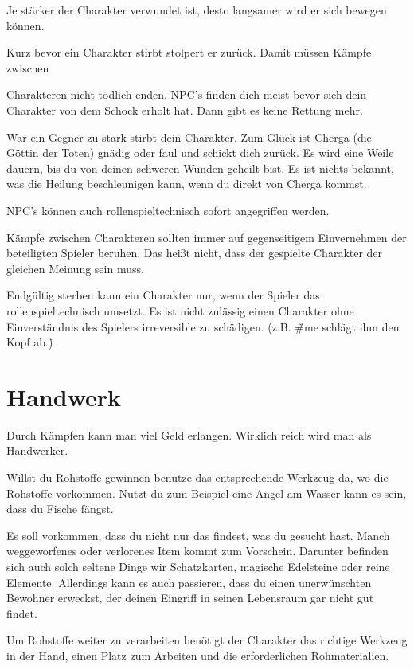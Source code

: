 \documentclass[a4paper,11pt]{book}
\begin{document}
Je stärker der Charakter verwundet ist, desto langsamer wird er sich bewegen können.

Kurz bevor ein Charakter stirbt stolpert er zurück. Damit müssen Kämpfe zwischen

Charakteren nicht tödlich enden. NPC’s finden dich meist bevor sich dein Charakter von dem Schock erholt hat. Dann gibt es keine Rettung mehr.

War ein Gegner zu stark stirbt dein Charakter. Zum Glück ist Cherga (die Göttin der Toten) gnädig oder faul und schickt dich zurück. Es wird eine Weile dauern, bis du von deinen schweren Wunden geheilt bist. Es ist nichts bekannt, was die Heilung beschleunigen kann, wenn du direkt von Cherga kommst.



NPC’s können auch rollenspieltechnisch sofort angegriffen werden.

 Kämpfe zwischen Charakteren sollten immer auf gegenseitigem Einvernehmen der beteiligten Spieler beruhen. Das heißt nicht, dass der gespielte Charakter der gleichen Meinung sein muss.

Endgültig sterben kann ein Charakter nur, wenn der Spieler das rollenspieltechnisch umsetzt. Es ist nicht zulässig einen Charakter ohne Einverständnis des Spielers irreversible zu schädigen. (z.B. \"\#me schlägt ihm den Kopf ab.\")

\section{Handwerk}

Durch Kämpfen kann man viel Geld erlangen. Wirklich reich wird man als Handwerker.

Willst du Rohstoffe gewinnen benutze das entsprechende Werkzeug da, wo die Rohstoffe vorkommen. Nutzt du zum Beispiel eine Angel am Wasser kann es sein, dass du Fische fängst.

Es soll vorkommen, dass du nicht nur das findest, was du gesucht hast. Manch weggeworfenes oder verlorenes Item kommt zum Vorschein. Darunter befinden sich auch solch seltene Dinge wir Schatzkarten, magische Edelsteine oder reine Elemente. Allerdings kann es auch passieren, dass du einen unerwünschten Bewohner erweckst, der deinen Eingriff in seinen Lebensraum gar nicht gut findet.

Um Rohstoffe weiter zu verarbeiten benötigt der Charakter das richtige Werkzeug in der Hand, einen Platz zum Arbeiten und die erforderlichen Rohmaterialien.
\end{document}
